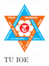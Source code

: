 \documentclass[12pt]{article}
\begin{document}
\makecover

\setupmain

\begin{figure}[h]
    \centering
    \includegraphics[width=0.2\textwidth]{logo.png} %
    \caption{TU IOE}
\end{figure}
\end{document}
